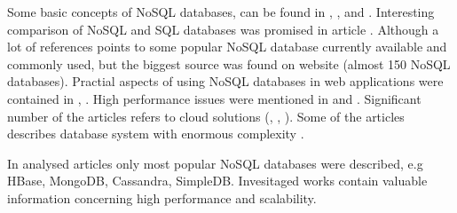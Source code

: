 \documentclass[times, 10pt,twocolumn]{article}
\begin{document}





Some basic concepts of NoSQL databases, can be found in \cite{survey}, \cite{strauch}, \cite{leavittm} and \cite{prasad}. Interesting 
comparison of NoSQL and SQL databases was promised in article \cite{cattell}. Although a lot of references points to some popular NoSQL database currently 
available and commonly used, but the biggest source was found on website \cite{nosql-database} (almost 150 NoSQL databases). Practial aspects of using NoSQL 
databases in web applications were contained in \cite{tiwari} \cite{orend}, \cite{pokorny}. High performance issues were mentioned in \cite{taniar} and \cite{delis}.
Significant number of the articles refers to cloud solutions (\cite{sakr}, \cite{konstantinou}, \cite{delis}). Some of the articles describes database system with enormous 
complexity \cite{rizzotti}. 




In analysed articles only most popular NoSQL databases were described, e.g HBase, MongoDB, Cassandra, SimpleDB.
Invesitaged works contain valuable information concerning high performance and scalability. 






\end{document}
